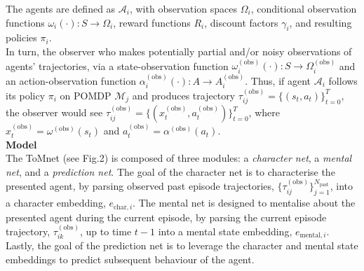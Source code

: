 \documentclass[twocolumn,superscriptaddress,aps]{revtex4-1}
\begin{document}
The agents are defined as $\mathcal{A}_i$, with observation spaces $\Omega_i$, conditional observation functions $\omega_i(\cdot):S\rightarrow\Omega_i$, reward functions $R_i$, discount factors $\gamma_i$, and resulting policies $\pi_i$.\\

In turn, the observer who makes potentially partial and/or noisy observations of agents' trajectories, via a state-observation function $\omega_i^{(\text{obs})}(\cdot):S\rightarrow\Omega_i^{(\text{obs})}$ and an action-observation function $\alpha_i^{(\text{obs})}(\cdot):A\rightarrow A_i^{(\text{obs})}$. Thus, if agent $\mathcal{A}_i$ follows its policy $\pi_i$ on POMDP $\mathcal{M}_j$ and produces trajectory $\tau_{ij}^{(\text{obs})} = \{(s_t, a_t)\}_{t=0}^T$, the observer would see $\tau_{ij}^{(\text{obs})} = \{(x_t^{(\text{obs})},a_t^{(\text{obs})})\}_{t=0}^T$, where $x_t^{(\text{obs})} = \omega^{(\text{obs})}(s_t)$ and $a_t^{(\text{obs})} = \alpha^{(\text{obs})}(a_t)$.\\

\noindent \textbf{Model} \\[0.15cm]
The ToMnet (see Fig.2) is composed of three modules: a \textit{character net}, a \textit{mental net}, and a \textit{prediction net}. The goal of the character net is to characterise the presented agent, by parsing observed past episode trajectories, $\{\tau_{ij}^{(\text{obs})}\}_{j=1}^{N_{\text{past}}}$, into a character embedding, $e_{\text{char},i}$. The mental net is designed to mentalise about the presented agent during the current episode, by parsing the current episode trajectory, $\tau_{ik}^{(\text{obs})}$, up to time $t-1$ into a mental state embedding, $e_{\text{mental},i}$. Lastly, the goal of the prediction net is to leverage the character and mental state embeddings to predict subsequent behaviour of the agent. \\
\end{document}
